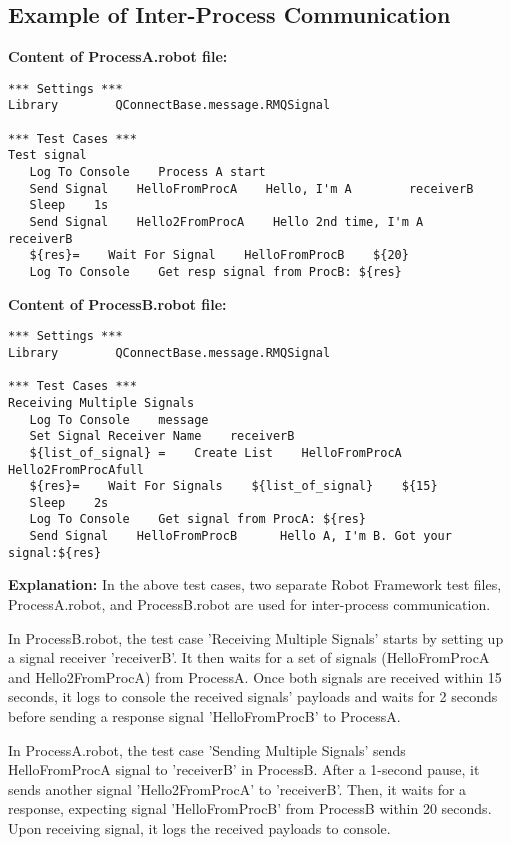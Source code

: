 \subsection{Example of Inter-Process Communication}

\textbf{Content of ProcessA.robot file:}
\begin{verbatim}
*** Settings ***
Library        QConnectBase.message.RMQSignal

*** Test Cases ***
Test signal
   Log To Console    Process A start
   Send Signal    HelloFromProcA    Hello, I'm A        receiverB
   Sleep    1s
   Send Signal    Hello2FromProcA    Hello 2nd time, I'm A        receiverB
   ${res}=    Wait For Signal    HelloFromProcB    ${20}
   Log To Console    Get resp signal from ProcB: ${res}
\end{verbatim}

\textbf{Content of ProcessB.robot file:}
\begin{verbatim}
*** Settings ***
Library        QConnectBase.message.RMQSignal

*** Test Cases ***
Receiving Multiple Signals
   Log To Console    message
   Set Signal Receiver Name    receiverB
   ${list_of_signal} =    Create List    HelloFromProcA    Hello2FromProcAfull
   ${res}=    Wait For Signals    ${list_of_signal}    ${15}
   Sleep    2s
   Log To Console    Get signal from ProcA: ${res}
   Send Signal    HelloFromProcB      Hello A, I'm B. Got your signal:${res}
\end{verbatim}

\textbf{Explanation:}
In the above test cases, two separate Robot Framework test files, ProcessA.robot, and ProcessB.robot are used for inter-process communication.

In ProcessB.robot, the test case 'Receiving Multiple Signals' starts by setting up a signal receiver 'receiverB'. It then waits for a set of signals (HelloFromProcA and Hello2FromProcA) from ProcessA. Once both signals are received within 15 seconds, it logs to console the received signals' payloads and waits for 2 seconds before sending a response signal 'HelloFromProcB' to ProcessA.

In ProcessA.robot, the test case 'Sending Multiple Signals' sends HelloFromProcA signal to 'receiverB' in ProcessB. After a 1-second pause, it sends another signal 'Hello2FromProcA' to 'receiverB'. Then, it waits for a response, expecting signal 'HelloFromProcB' from ProcessB within 20 seconds. Upon receiving signal, it logs the received payloads to console.




